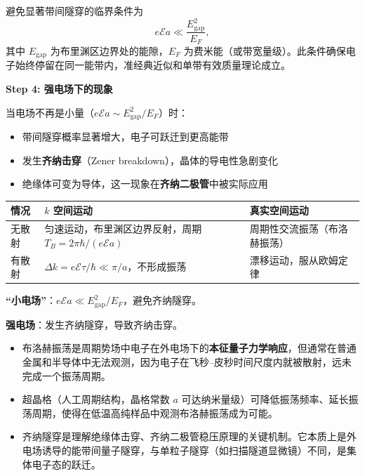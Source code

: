\begin{derivationbox}[标准解题过程]
避免显著带间隧穿的临界条件为
\begin{equation}
\boxed{e\mathcal{E}a\ll\frac{E_{\text{gap}}^2}{E_F},}
\end{equation}
其中 $E_{\text{gap}}$ 为布里渊区边界处的能隙，$E_F$ 为费米能（或带宽量级）。此条件确保电子始终停留在同一能带内，准经典近似和单带有效质量理论成立。

\textbf{Step 4: 强电场下的现象}

当电场不再是小量（$e\mathcal{E}a\sim E_{\text{gap}}^2/E_F$）时：
\begin{itemize}
    \item 带间隧穿概率显著增大，电子可跃迁到更高能带
    \item 发生\textbf{齐纳击穿}（Zener breakdown），晶体的导电性急剧变化
    \item 绝缘体可变为导体，这一现象在\textbf{齐纳二极管}中被实际应用
\end{itemize}
\end{derivationbox}

\begin{formulabox}[答案汇总]
\begin{center}
\begin{tabular}{lll}
\toprule
\textbf{情况} & \textbf{$k$ 空间运动} & \textbf{真实空间运动} \\
\midrule
无散射 & 匀速运动，布里渊区边界反射，周期 $T_B=2\pi\hbar/(e\mathcal{E}a)$ & 周期性交流振荡（布洛赫振荡） \\
有散射 & $\Delta k=e\mathcal{E}\tau/\hbar\ll\pi/a$，不形成振荡 & 漂移运动，服从欧姆定律 \\
\bottomrule
\end{tabular}
\end{center}

\textbf{``小电场''}：$e\mathcal{E}a\ll E_{\text{gap}}^2/E_F$，避免齐纳隧穿。

\textbf{强电场}：发生齐纳隧穿，导致齐纳击穿。
\end{formulabox}

\begin{insightbox}[物理图像]
\begin{itemize}
    \item 布洛赫振荡是周期势场中电子在外电场下的\textbf{本征量子力学响应}，但通常在普通金属和半导体中无法观测，因为电子在飞秒--皮秒时间尺度内就被散射，远未完成一个振荡周期。
    \item 超晶格（人工周期结构，晶格常数 $a$ 可达纳米量级）可降低振荡频率、延长振荡周期，使得在低温高纯样品中观测布洛赫振荡成为可能。
    \item 齐纳隧穿是理解绝缘体击穿、齐纳二极管稳压原理的关键机制。它本质上是外电场诱导的能带间量子隧穿，与单粒子隧穿（如扫描隧道显微镜）不同，是集体电子态的跃迁。
\end{itemize}
\end{insightbox}
